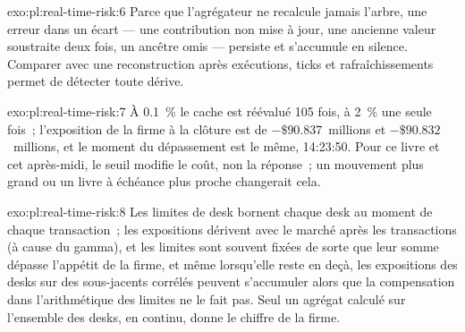 \begin{solution}{exo:pl:real-time-risk:6}
Parce que l'agrégateur ne recalcule jamais l'arbre, une erreur dans un écart --- une contribution non mise à jour, une ancienne valeur soustraite deux fois,
un ancêtre omis --- persiste et s'accumule en silence. Comparer avec une reconstruction après exécutions, ticks et rafraîchissements permet de détecter toute dérive.
\end{solution}

\begin{solution}{exo:pl:real-time-risk:7}
À 0.1~\% le cache est réévalué 105 fois, à 2~\% une seule fois~; l'exposition de la firme à la clôture est de $-\$90.837$~millions et $-\$90.832$~millions, et le
moment du dépassement est le même, 14:23:50. Pour ce livre et cet après-midi, le seuil modifie le coût, non la réponse~; un mouvement plus grand ou un
livre à échéance plus proche changerait cela.
\end{solution}

\begin{solution}{exo:pl:real-time-risk:8}
Les limites de desk bornent chaque desk au moment de chaque transaction~; les expositions dérivent avec le marché après les transactions (à cause du gamma), et les limites sont souvent fixées de sorte que
leur somme dépasse l'appétit de la firme, et même lorsqu'elle reste en deçà, les expositions des desks sur des sous-jacents corrélés peuvent s'accumuler alors que
la compensation dans l'arithmétique des limites ne le fait pas. Seul un agrégat calculé sur l'ensemble des desks, en continu, donne le chiffre de la firme.
\end{solution}


